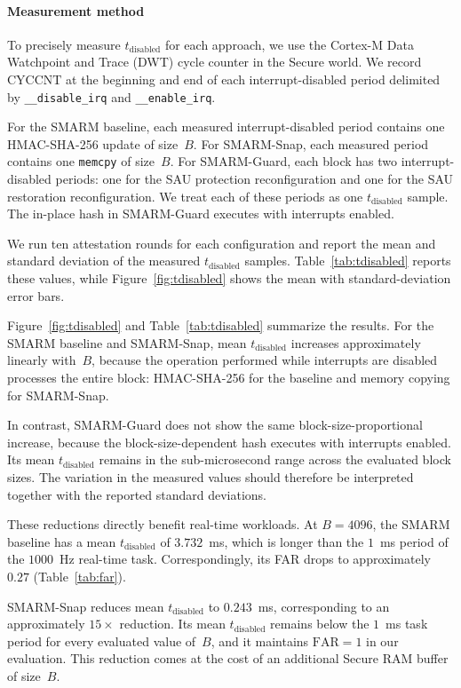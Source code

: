 \documentclass[conference]{IEEEtran}
\newcommand{\tdis}{$t_{\mathrm{disabled}}$\xspace}
\newcommand{\smarmcopy}{SMARM-Snap\xspace}
\newcommand{\smarmlock}{SMARM-Guard\xspace}
\begin{document}
\paragraph{Measurement method}
To precisely measure \tdis{} for each approach, we use the Cortex-M
Data Watchpoint and Trace (DWT) cycle counter in the Secure world.
We record $\mathrm{CYCCNT}$ at the beginning and end of each
interrupt-disabled period delimited by
\texttt{\_\_disable\_irq} and \texttt{\_\_enable\_irq}.

For the SMARM baseline, each measured interrupt-disabled period contains
one HMAC-SHA-256 update of size~$B$. For \smarmcopy{}, each measured
period contains one \texttt{memcpy} of size~$B$.
For \smarmlock{}, each block has two interrupt-disabled periods:
one for the SAU protection reconfiguration and one for the SAU
restoration reconfiguration. We treat each of these periods as one
\tdis{} sample. The in-place hash in \smarmlock{} executes with
interrupts enabled.

We run ten attestation rounds for each configuration and report the
mean and standard deviation of the measured \tdis{} samples.
Table~\ref{tab:tdisabled} reports these values, while
Figure~\ref{fig:tdisabled} shows the mean with standard-deviation
error bars.

Figure~\ref{fig:tdisabled} and Table~\ref{tab:tdisabled} summarize the
results. For the SMARM baseline and \smarmcopy{}, mean \tdis{}
increases approximately linearly with~$B$, because the operation
performed while interrupts are disabled processes the entire block:
HMAC-SHA-256 for the baseline and memory copying for \smarmcopy{}.

In contrast, \smarmlock{} does not show the same block-size-proportional
increase, because the block-size-dependent hash executes with interrupts
enabled. Its mean \tdis{} remains in the sub-microsecond range across
the evaluated block sizes. The variation in the measured values should
therefore be interpreted together with the reported standard deviations.

These reductions directly benefit real-time workloads.
At $B{=}4096$, the SMARM baseline has a mean \tdis{} of $3.732$~ms,
which is longer than the $1$~ms period of the $1000$~Hz real-time task.
Correspondingly, its FAR drops to approximately $0.27$
(Table~\ref{tab:far}).

\smarmcopy{} reduces mean \tdis{} to $0.243$~ms, corresponding to an
approximately $15\times$ reduction. Its mean \tdis{} remains below the
$1$~ms task period for every evaluated value of~$B$, and it maintains
$\mathrm{FAR}{=}1$ in our evaluation. This reduction comes at the cost
of an additional Secure RAM buffer of size~$B$.
\end{document}

